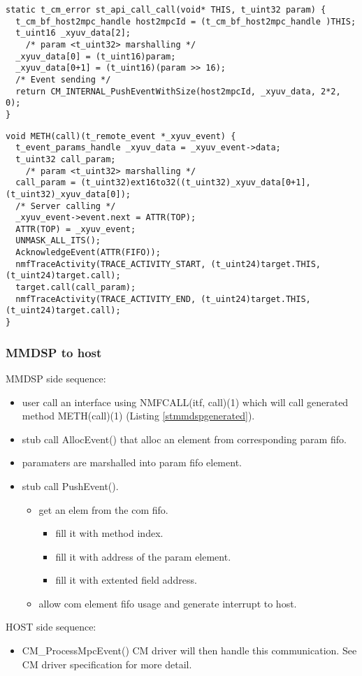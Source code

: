 \begin{lstlisting}[caption=st\_api\_call\_call() generated host code,
label=sthostgenerated]
static t_cm_error st_api_call_call(void* THIS, t_uint32 param) {
  t_cm_bf_host2mpc_handle host2mpcId = (t_cm_bf_host2mpc_handle )THIS;
  t_uint16 _xyuv_data[2];
    /* param <t_uint32> marshalling */
  _xyuv_data[0] = (t_uint16)param;
  _xyuv_data[0+1] = (t_uint16)(param >> 16);
  /* Event sending */
  return CM_INTERNAL_PushEventWithSize(host2mpcId, _xyuv_data, 2*2, 0);
}
\end{lstlisting}

\begin{lstlisting}[caption=MMDSP call() skeleton ,label=skmmdspgenerated]
void METH(call)(t_remote_event *_xyuv_event) {
  t_event_params_handle _xyuv_data = _xyuv_event->data;
  t_uint32 call_param;
    /* param <t_uint32> marshalling */
  call_param = (t_uint32)ext16to32((t_uint32)_xyuv_data[0+1], (t_uint32)_xyuv_data[0]);
  /* Server calling */
  _xyuv_event->event.next = ATTR(TOP);
  ATTR(TOP) = _xyuv_event;
  UNMASK_ALL_ITS();
  AcknowledgeEvent(ATTR(FIFO));
  nmfTraceActivity(TRACE_ACTIVITY_START, (t_uint24)target.THIS, (t_uint24)target.call);
  target.call(call_param);
  nmfTraceActivity(TRACE_ACTIVITY_END, (t_uint24)target.THIS, (t_uint24)target.call);
}
\end{lstlisting}

\subsubsection{MMDSP to host}
MMDSP side sequence:
\begin{itemize}
  \item user call an interface using NMFCALL(itf, call)(1) which will call
  generated method METH(call)(1) (Listing \ref{stmmdspgenerated}).
  \item stub call AllocEvent() that alloc an element from corresponding param
  fifo.
  \item paramaters are marshalled into param fifo element.
  \item stub call PushEvent().
  \begin{itemize}
    \item get an elem from the com fifo.
    \begin{itemize}
      \item fill it with method index.
      \item fill it with address of the param element.
      \item fill it with extented field address.
    \end{itemize}
    \item allow com element fifo usage and generate interrupt to host.
  \end{itemize}
\end{itemize}
HOST side sequence:
\begin{itemize}
  \item CM\_ProcessMpcEvent() CM driver will then handle this communication. See
  CM driver specification for more detail.
\end{itemize}

